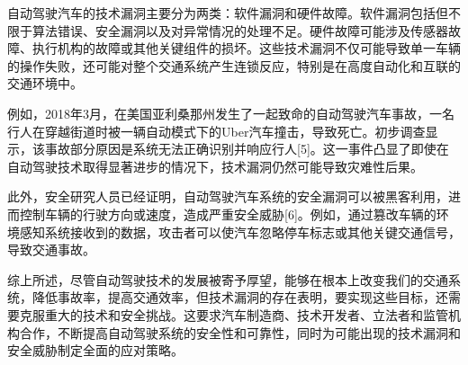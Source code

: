 自动驾驶汽车的技术漏洞主要分为两类：软件漏洞和硬件故障。软件漏洞包括但不限于算法错误、安全漏洞以及对异常情况的处理不足。硬件故障可能涉及传感器故障、执行机构的故障或其他关键组件的损坏。这些技术漏洞不仅可能导致单一车辆的操作失败，还可能对整个交通系统产生连锁反应，特别是在高度自动化和互联的交通环境中。

例如，2018年3月，在美国亚利桑那州发生了一起致命的自动驾驶汽车事故，一名行人在穿越街道时被一辆自动模式下的Uber汽车撞击，导致死亡。初步调查显示，该事故部分原因是系统无法正确识别并响应行人[5]。这一事件凸显了即使在自动驾驶技术取得显著进步的情况下，技术漏洞仍然可能导致灾难性后果。

此外，安全研究人员已经证明，自动驾驶汽车系统的安全漏洞可以被黑客利用，进而控制车辆的行驶方向或速度，造成严重安全威胁[6]。例如，通过篡改车辆的环境感知系统接收到的数据，攻击者可以使汽车忽略停车标志或其他关键交通信号，导致交通事故。

综上所述，尽管自动驾驶技术的发展被寄予厚望，能够在根本上改变我们的交通系统，降低事故率，提高交通效率，但技术漏洞的存在表明，要实现这些目标，还需要克服重大的技术和安全挑战。这要求汽车制造商、技术开发者、立法者和监管机构合作，不断提高自动驾驶系统的安全性和可靠性，同时为可能出现的技术漏洞和安全威胁制定全面的应对策略。

